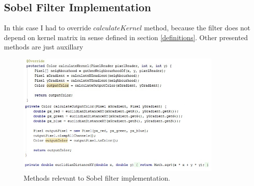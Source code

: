 \documentclass{article}
\begin{document}
\subsection{Sobel Filter Implementation} \label{sobel_impl}
In this case I had to override $calculateKernel$ method, because the filter does not depend on kernel matrix in sense defined in section \ref{definitions}. Other presented methods are just auxillary 
\begin{figure}[H]
	\centering
	\includegraphics[width=0.9\textwidth]{_Figures/code/sobel_1.jpg}
    \caption{Methods relevant to Sobel filter implementation.}
    \label{fig:code:sobel_1}
\end{figure}

\newpage
\end{document}
